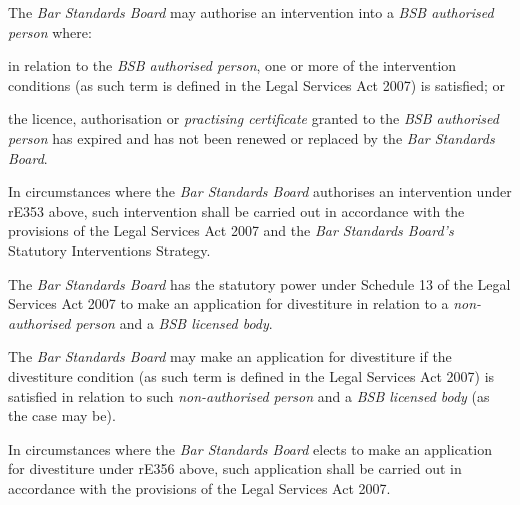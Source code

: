 The \emph{Bar Standards Board} may authorise an intervention into
a \emph{BSB authorised person} where:\\\nl \item in relation to the \emph{BSB authorised person}, one or more of the
intervention conditions (as such term is defined in the Legal Services
Act 2007) is satisfied; or\item the licence, authorisation or \emph{practising certificate} granted
to the \emph{BSB authorised person} has expired and has not been renewed
or replaced by the \emph{Bar Standards Board}.\ln
{}\par
In circumstances where the \emph{Bar Standards Board} authorises an
intervention under rE353 above, such intervention shall be carried out
in accordance with the provisions of the Legal Services Act 2007 and
the \emph{Bar Standards Board's} Statutory Interventions Strategy.\\
\par
{}
The \emph{Bar Standards Board} has the statutory power under Schedule 13
of the Legal Services Act 2007 to make an application for divestiture in
relation to a \emph{non-authorised person} and a \emph{BSB licensed
body}.\\
\par
The \emph{Bar Standards Board} may make an application for divestiture
if the divestiture condition (as such term is defined in the Legal
Services Act 2007) is satisfied in relation to such \emph{non-authorised
person} and a \emph{BSB licensed body} (as the case may be).\\
\par
In circumstances where the \emph{Bar Standards Board} elects to make an
application for divestiture under rE356 above, such application shall be
carried out in accordance with the provisions of the Legal Services Act
2007.\\
